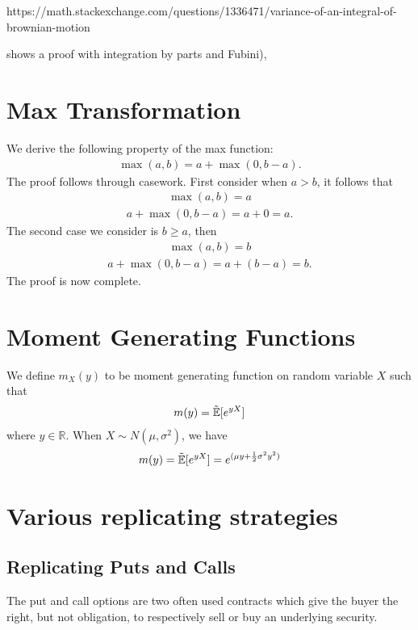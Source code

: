 \documentclass[reqno]{amsart}
\newcommand{\rE}[1]{\tilde{\E}[#1]}
\begin{document}
https://math.stackexchange.com/questions/1336471/variance-of-an-integral-of-brownian-motion 

shows a proof with integration by parts and Fubini),


\section{Max Transformation} \label{Max appendix}
We derive the following property of the max function:
\begin{align}
     \max(a, b) = a + \max(0, b-a).
\end{align}
The proof follows through casework. First consider when $a > b$, it follows that
\begin{align}
     \max(a, b) = a
\end{align}
\begin{align}
     a + \max(0, b-a) = a + 0 = a.
\end{align}
The second case we consider is $b \geq a$, then
\begin{align}
     \max(a, b) = b
\end{align}
\begin{align}
     a + \max(0, b-a) = a + (b - a) = b.
\end{align}
The proof is now complete.

\section{Moment Generating Functions}

We define $m_X(y)$ to be moment generating function on random variable $X$ such that 
\begin{align}
     m(y) = \rE{e^{yX}}
\end{align}
where $y \in \mathbb{R}$. When $X \sim N(\mu, \sigma^2)$, we have 
\begin{align} \label{mgf func}
     m(y) = \rE{e^{yX}} = e^{(\mu y + \frac{1}{2} \sigma^2 y^2)}
\end{align}
\section{Various replicating strategies}

\subsection{Replicating Puts and Calls}

The put and call options are two often used contracts which give the buyer the right, but not obligation, to respectively sell or buy an underlying security. 
\end{document}

